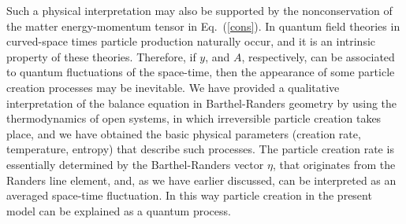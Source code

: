 \documentclass[aps,superscriptaddress, showpacs,preprintnumbers, superscriptaddress, nofootinbibt,twocolumn]{revtex4-2}
\begin{document}
Such a physical interpretation may also be supported by the nonconservation of the matter energy-momentum tensor in Eq.~(\ref{cons}). In quantum field theories in curved-space times particle production naturally occur, and it is an intrinsic property of these theories. Therefore, if $y$, and $A$, respectively, can be associated to quantum fluctuations of the space-time, then the appearance of some particle creation processes may be inevitable. We have provided a qualitative interpretation of the balance equation in Barthel-Randers geometry by using the thermodynamics of open systems, in which irreversible particle creation takes place, and we have obtained the basic physical parameters (creation rate, temperature, entropy) that describe such processes. The particle creation rate is essentially determined by the Barthel-Randers vector $\eta$, that originates from the Randers line element, and, as we have earlier discussed, can be interpreted as an averaged space-time fluctuation. In this way particle creation in the present model can be explained as a quantum process.
\end{document}
